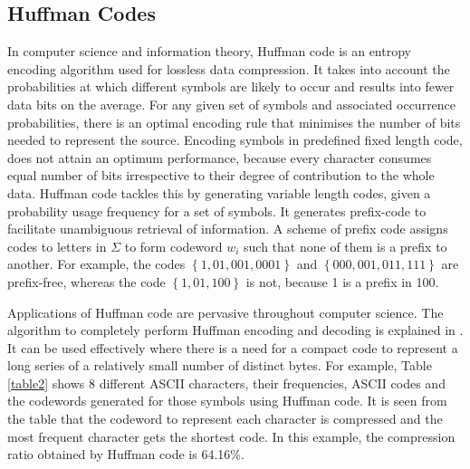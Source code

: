 \documentclass[preprint,12pt]{elsarticle}%
\begin{document}
\subsection{Huffman Codes}
In computer science and information theory, Huffman code is an entropy encoding algorithm used for lossless data compression. It takes into account the probabilities at which different symbols are likely to occur and results into fewer data bits on the average. 
For any given set of symbols and associated occurrence probabilities, there is an optimal encoding rule that minimises the number of bits needed to represent the source. Encoding symbols in predefined fixed length code, does not attain an optimum performance, because every character consumes equal number of bits irrespective to their degree of contribution to the whole data. Huffman code tackles this by generating variable length codes, given a probability usage frequency for a set of symbols. It generates prefix-code to facilitate unambiguous retrieval of information. A scheme of prefix code assigns codes to letters in $\Sigma$ to form codeword $w_i$ such that none of them is a prefix to another. For example, the codes $\left\{ 1,01,001,0001\right\}$ and $\left\{ 000,001,011,111\right\}$ are prefix-free, whereas the code $\left\{ 1,01,100\right\}$ is not, because 1 is a prefix in 100.

Applications of Huffman code are pervasive throughout
computer science. The algorithm to completely perform Huffman encoding and decoding is explained in \cite{Amst86}. It can be used effectively where there is a need for a compact code to represent a long series of a relatively small number of distinct bytes. For example, Table \ref{table2} shows 8 different ASCII characters, their frequencies, ASCII codes and the codewords generated for those symbols using Huffman code. It is seen from the table that the codeword to represent each character is compressed and the most frequent character gets the shortest code. In this example, the compression ratio obtained by Huffman code is 64.16\%.   
\end{document}
